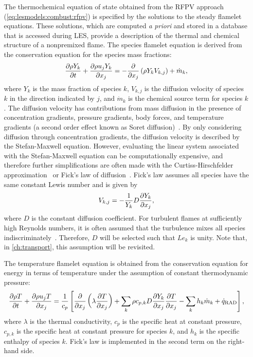 The thermochemical equation of state obtained from the RFPV approach (\cref{eq:lesmodels:combust:rfpv}) is specified by the solutions to the steady flamelet equations. These solutions, which are computed \textit{a priori} and stored in a database that is accessed during LES, provide a description of the thermal and chemical structure of a nonpremixed flame. The species flamelet equation is derived from the conservation equation for the species mass fractions:
\begin{equation}\label{eq:lesmodels:combust:flamelet:consy}
  \trder{Y_k} = -\pder[]{x_j}\left( \rho Y_k V_{k,j} \right) + \dot{m}_k,
\end{equation}
where $Y_k$ is the mass fraction of species $k$, $V_{k,j}$ is the diffusion velocity of species $k$ in the direction indicated by $j$, and $\dot{m}_k$ is the chemical source term for species $k$. The diffusion velocity has contributions from mass diffusion in the presence of concentration gradients, pressure gradients, body forces, and temperature gradients (a second order effect known as Soret diffusion)~\cite{law2006}. By only considering diffusion through concentration gradients, the diffusion velocity is described by the Stefan-Maxwell equation. However, evaluating the linear system associated with the Stefan-Maxwell equation can be computationally expensive, and therefore further simplifications are often made with the Curtiss-Hirschfelder approximation~\cite{curtiss1949} or Fick's law of diffusion~\cite{fick1855}. Fick's law assumes all species have the same constant Lewis number and is given by
\begin{equation}\label{eq:lesmodels:combust:flamelet:fick}
  V_{k,j} = -\frac{1}{Y_k}D\pder[Y_k]{x_j},
\end{equation}
where $D$ is the constant diffusion coefficient. For turbulent flames at sufficiently high Reynolds numbers, it is often assumed that the turbulence mixes all species indiscriminately~\cite{pitsch19981057}. Therefore, $D$ will be selected such that $Le_k$ is unity. Note that, in \cref{ch:transport}, this assumption will be revisited.

The temperature flamelet equation is obtained from the conservation equation for energy in terms of temperature under the assumption of constant thermodynamic pressure:
\begin{equation}\label{eq:lesmodels:combust:flamelet:const}
  \trder{T} = \frac{1}{c_p}\left[ \pder[]{x_j}\left( \lambda\pder[T]{x_j} \right) + \sum\limits_{k} \rho c_{p,k} D\pder[Y_k]{x_j}\pder[T]{x_j} - \sum\limits_{k} h_k\dot{m}_k + \dot{q}_{\text{RAD}} \right],
\end{equation}
where $\lambda$ is the thermal conductivity, $c_p$ is the specific heat at constant pressure, $c_{p,k}$ is the specific heat at constant pressure for species $k$, and $h_k$ is the specific enthalpy of species $k$. Fick's law is implemented in the second term on the right-hand side.

